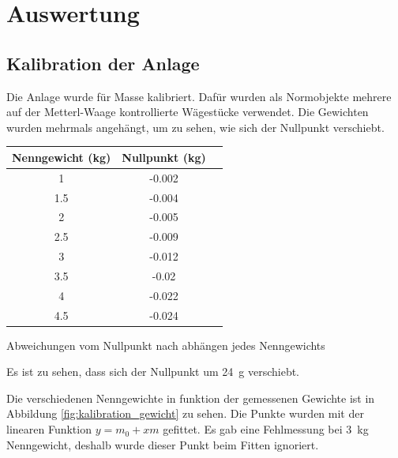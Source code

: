 \section{Auswertung}

\subsection{Kalibration der Anlage}

Die Anlage wurde f\"ur Masse kalibriert. Daf\"ur wurden als  Normobjekte mehrere
auf  der  Metterl-Waage  kontrollierte W\"agest\"ucke verwendet.  Die  Gewichten
wurden mehrmals angeh\"angt,  um  zu  sehen,  wie sich der Nullpunkt verschiebt.

\begin{center}
    \begin{threeparttable}
        \begin{tabular}{ccc}
            \toprule
            Nenngewicht (kg) & Nullpunkt (kg) \\
            \midrule
            1   & -0.002 \\
            1.5 & -0.004 \\
            2   & -0.005 \\
            2.5 & -0.009 \\
            3   & -0.012 \\
            3.5 & -0.02  \\
            4   & -0.022 \\
            4.5 & -0.024 \\
            \bottomrule
        \end{tabular}
        \caption{Abweichungen vom Nullpunkt nach abh\"angen jedes Nenngewichts}
    \end{threeparttable}
\end{center}

Es ist zu sehen, dass sich der Nullpunkt um \SI{24}{\gram} verschiebt.

Die  verschiedenen  Nenngewichte in funktion  der  gemessenen  Gewichte  ist  in
Abbildung  \ref{fig:kalibration_gewicht} zu sehen. Die  Punkte  wurden  mit  der
linearen   Funktion  $y=m_0+xm$  gefittet.   Es   gab   eine   Fehlmessung   bei
\SI{3}{\kilo\gram}  Nenngewicht,  deshalb  wurde   dieser   Punkt   beim  Fitten
ignoriert.

